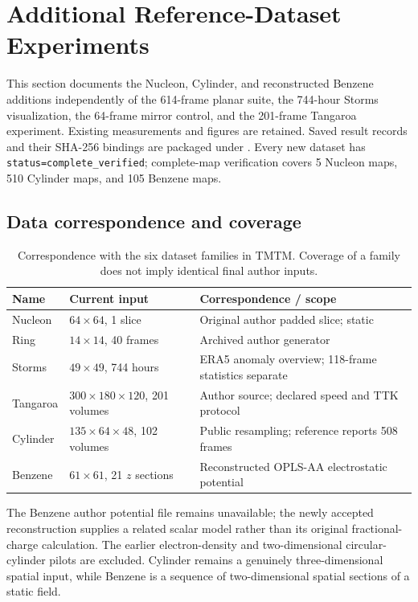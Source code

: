 \section{Additional Reference-Dataset Experiments}\label{sec:additional_experiments}
This section documents the Nucleon, Cylinder, and reconstructed Benzene additions independently of the 614-frame planar suite, the 744-hour Storms visualization, the 64-frame mirror control, and the 201-frame Tangaroa experiment. Existing measurements and figures are retained. Saved result records and their SHA-256 bindings are packaged under . Every new dataset has \texttt{status=complete\_verified}; complete-map verification covers 5 Nucleon maps, 510 Cylinder maps, and 105 Benzene maps.

\subsection{Data correspondence and coverage}
\begin{table}[H]\centering\small
\caption{Correspondence with the six dataset families in TMTM. Coverage of a family does not imply identical final author inputs.}\label{tab:s_reference_coverage}
\begin{tabular}{lll}\toprule
Name & Current input & Correspondence / scope\\\midrule
Nucleon & $64\times64$, 1 slice & Original author padded slice; static\\
Ring & $14\times14$, 40 frames & Archived author generator\\
Storms & $49\times49$, 744 hours & ERA5 anomaly overview; 118-frame statistics separate\\
Tangaroa & $300\times180\times120$, 201 volumes & Author source; declared speed and TTK protocol\\
Cylinder & $135\times64\times48$, 102 volumes & Public resampling; reference reports 508 frames\\
Benzene & $61\times61$, 21 $z$ sections & Reconstructed OPLS-AA electrostatic potential\\
\bottomrule\end{tabular}\end{table}
The Benzene author potential file remains unavailable; the newly accepted reconstruction supplies a related scalar model rather than its original fractional-charge calculation. The earlier electron-density and two-dimensional circular-cylinder pilots are excluded. Cylinder remains a genuinely three-dimensional spatial input, while Benzene is a sequence of two-dimensional spatial sections of a static field.

